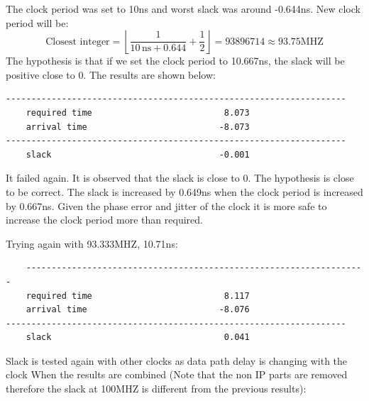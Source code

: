 \documentclass{report}
\begin{document}
The clock period was set to 10ns and worst slack was around -0.644ns. New clock period will be:
\[
\text{Closest integer} = \left\lfloor \frac{1}{10 \, \text{ns} + 0.644} + \frac{1}{2} \right\rfloor = 93896714 \approx 93.75 \text{MHZ}
\]
The hypothesis is that if we set the clock period to 10.667ns, the slack will be positive close to 0. The results are shown below:
\begin{verbatim}
-------------------------------------------------------------------
    required time                          8.073    
    arrival time                          -8.073    
-------------------------------------------------------------------
    slack                                 -0.001
\end{verbatim}
It failed again. It is observed that the slack is close to 0. The hypothesis is close to be correct. The slack is increased by 0.649ns when the clock period is increased by 0.667ns. Given the phase error and jitter of the clock it is more safe to increase the clock period more than required.

Trying again with 93.333MHZ, 10.71ns:

\begin{verbatim}
    -------------------------------------------------------------------
    required time                          8.117    
    arrival time                          -8.076    
-------------------------------------------------------------------
    slack                                  0.041    
\end{verbatim}
Slack is tested again with other clocks as data path delay is changing with the clock When the results are combined (Note that the non IP parts are removed therefore the slack at 100MHZ is different from the previous results):

\text{}
\end{document}
